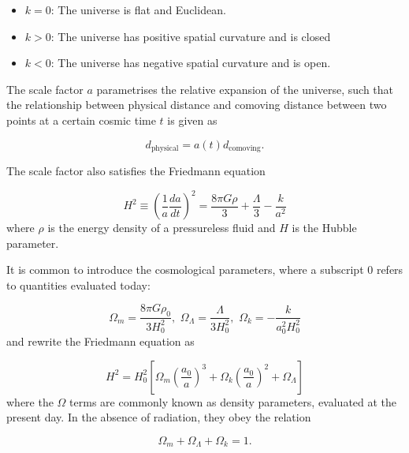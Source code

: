 \begin{itemize}
  \item $k = 0$: The universe is flat and Euclidean.
  \item $k > 0$: The universe has positive spatial curvature and is closed
  \item $k < 0$: The universe has negative spatial curvature and is open. 
\end{itemize}

The scale factor $a$ parametrises the relative expansion of the universe, such that the relationship between physical distance and comoving distance between two points at a certain cosmic time $t$ is given as

\begin{equation}
  d_{\text{physical}} = a(t) d_{\text{comoving}}.
  \label{eq:comoving-physical-distance}
\end{equation}

The scale factor also satisfies the Friedmann equation

\begin{equation}
  H^2 \equiv \left ( \frac{1}{a}\frac{da}{dt} \right )^2 = \frac{8\pi G \rho}{3} + \frac{\Lambda}{3} - \frac{k}{a^2}
  \label{eq:friedmann-equation}
\end{equation}
where $\rho$ is the energy density of a pressureless fluid and $H$ is the Hubble parameter. 

It is common to introduce the cosmological parameters, where a subscript 0 refers to quantities evaluated today: 

\begin{equation}
  \Omega_m = \frac{8\pi G \rho_0}{3H_0^2}, \,\, \Omega_{\Lambda} = \frac{\Lambda}{3H_0^2}, \,\, \Omega_k = - \frac{k}{a_0^2 H_0^2}
  \label{eq:cosmo-params}
\end{equation}
and rewrite the Friedmann equation as

\begin{equation}
  H^2 = H_0^2 \left [ \Omega_m \left ( \frac{a_0}{a}\right )^3 + \Omega_k \left ( \frac{a_0}{a}\right )^2 + \Omega_{\Lambda} \right ]
  \label{eq:friedmann-eqn-version2}
\end{equation}
where the $\Omega$ terms are commonly known as density parameters, evaluated at the present day. In the absence of radiation, they obey the relation

\begin{equation}
  \Omega_m + \Omega_{\Lambda} + \Omega_k = 1.
  \label{eq:density-parameters-1}   
\end{equation} 


